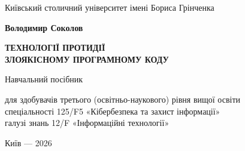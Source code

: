 \begin{titlepage}
\thispagestyle{empty}
\centering
\vspace*{6mm}

{\footnotesize\sffamily Київський столичний університет імені Бориса Грінченка\par}

\vfill

{\sffamily\bfseries Володимир Соколов\par}

\vspace{6mm}

{\Large\sffamily\bfseries ТЕХНОЛОГІЇ ПРОТИДІЇ\\[2mm]
ЗЛОЯКІСНОМУ ПРОГРАМНОМУ КОДУ\par}

\vspace{6mm}

{\large\sffamily Навчальний посібник\par}

\vspace{4mm}

{\footnotesize для здобувачів третього (освітньо-наукового) рівня вищої освіти\\
спеціальності 125/F5 «Кібербезпека та захист інформації»\\
галузі знань 12/F «Інформаційні технології»\par}

\vfill
\vfill

{\footnotesize Київ --- 2026\par}
\vspace*{4mm}
\end{titlepage}

